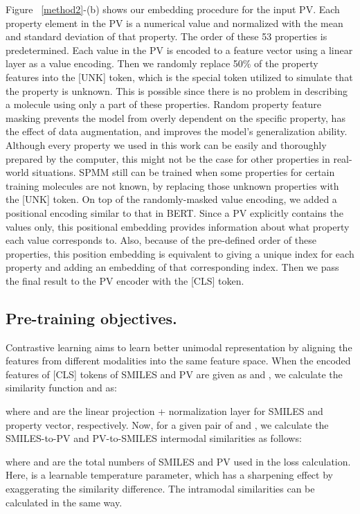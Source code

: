 \documentclass{nature_meth}
\newcommand{\1}{\blmath{1}}
\newcommand{\0}{\blmath{0}}
\begin{document}
Figure ~\ref{method2}-(b) shows our embedding procedure for the input PV. Each property element in the PV is a numerical value and normalized with the mean and standard deviation of that property. The order of these 53 properties is predetermined. Each value in the PV is encoded to a feature vector using a linear layer as a value encoding. Then we randomly replace 50\% of the property features into the [UNK] token, which is the special token utilized to simulate that the property is unknown. This is possible since there is no problem in describing a molecule using only a part of these properties. Random property feature masking prevents the model from overly dependent on the specific property, has the effect of data augmentation, and improves the model's generalization ability. Although every property we used in this work can be easily and thoroughly prepared by the computer, this might not be the case for other properties in real-world situations. SPMM still can be trained when some properties for certain training molecules are not known, by replacing those unknown properties with the [UNK] token. On top of the randomly-masked value encoding, we added a positional encoding similar to that in BERT. Since a PV explicitly contains the values only, this positional embedding provides information about what property each value corresponds to. Also, because of the pre-defined order of these properties, this position embedding is equivalent to giving a unique index for each property and adding an embedding of that corresponding index. 
Then we pass the final result to the PV encoder with the [CLS] token. 


\subsection{Pre-training objectives.}
Contrastive learning aims to learn better unimodal representation by aligning the features from different modalities into the same feature space\cite{clip}. When the encoded features of [CLS] tokens of SMILES  and PV  are given as  and , we calculate the similarity function  and  as:

where  and  are the linear projection + normalization layer for SMILES and property vector, respectively.
Now, for a given pair of  and , we calculate the SMILES-to-PV and PV-to-SMILES intermodal similarities as follows\cite{albef, clip}:

where  and  are the total numbers of SMILES and PV used in the loss calculation. Here,  is a learnable temperature parameter, which has a sharpening effect by exaggerating the similarity difference. 
The intramodal similarities can be calculated in the same way.
\end{document}
